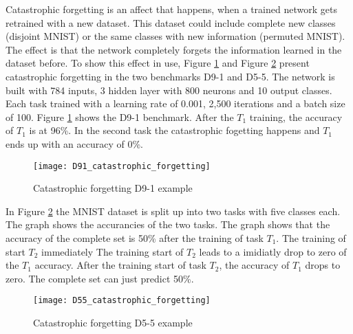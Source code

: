 Catastrophic forgetting is an affect that happens, when a trained network gets retrained with a new dataset.
This dataset could include complete new classes (disjoint MNIST) or the same classes with new information (permuted MNIST).
The effect is that the network completely forgets the information learned in the dataset before.
\newline
To show this effect in use, Figure \ref{fig:catastrophic_forgetting_d91_example} and Figure \ref{fig:catastrophic_forgetting_d55_example} present catastrophic forgetting in the two benchmarks D9-1 and D5-5.
\newline
The network is built with 784 inputs, 3 hidden layer with 800 neurons and 10 output classes.
Each task trained with a learning rate of 0.001, 2,500 iterations and a batch size of 100.
\newline
Figure \ref{fig:catastrophic_forgetting_d91_example} shows the D9-1 benchmark. After the $T_1$ training, the accuracy of $T_1$ is at 96\%. In the second task the catastrophic fogetting happens and $T_1$ ends up with an accuracy of 0\%.
\begin{figure}[H]
    \centering
    \texttt{[image: D91\_catastrophic\_forgetting]}
    \caption{Catastrophic forgetting D9-1 example}
    \label{fig:catastrophic_forgetting_d91_example}
\end{figure}

\newpage

In Figure \ref{fig:catastrophic_forgetting_d55_example} the MNIST dataset is split up into two tasks with five classes each.
The graph shows the accurancies of the two tasks.
The graph shows that the accuracy of the complete set is 50\% after the training of task $T_1$.
The training of start $T_2$ immediately
The training start of $T_2$ leads to a imidiatly drop to zero of the $T_1$ accuracy.
After the training start of task $T_2$, the accuracy of $T_1$ drops to zero.
The complete set can just predict 50\%.
\begin{figure}[H]
    \centering
    \texttt{[image: D55\_catastrophic\_forgetting]}
    \caption{Catastrophic forgetting D5-5 example}
    \label{fig:catastrophic_forgetting_d55_example}
\end{figure}


